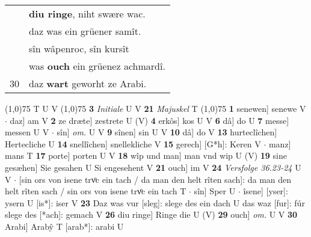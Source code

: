 \documentclass[8pt,a4paper,notitlepage]{article}
\begin{document}
\begin{table}[ht]
\begin{minipage}[t]{0.5\linewidth}
\begin{tabular}{rl}
 & \textbf{diu ringe}, niht swære wac.\\ 
 & daz was ein grüener samît.\\ 
 & sîn wâpenroc, sîn kursît\\ 
 & was \textbf{ouch} ein grüenez achmardî.\\ 
30 & daz \textbf{wart} geworht ze Arabi.\\ 
\end{tabular}
\scriptsize
\line(1,0){75} \newline
T U V \newline
\line(1,0){75} \newline
\textbf{3} \textit{Initiale} U V  \textbf{21} \textit{Majuskel} T  \newline
\line(1,0){75} \newline
\textbf{1} senewen] senewe V  $\cdot$ daz] am V \textbf{2} ze dræte] zestrete U (V) \textbf{4} erkôs] kos U V \textbf{6} dâ] do U \textbf{7} messe] messen U V  $\cdot$ sîn] \textit{om.} U V \textbf{9} sînen] sin U V \textbf{10} dâ] do V \textbf{13} hurteclîchen] Hertecliche U \textbf{14} snellîchen] snellekliche V \textbf{15} gerech] [G*h]: Keren V  $\cdot$ manz] mans T \textbf{17} porte] porten U V \textbf{18} wîp und man] man vnd wip U (V) \textbf{19} sine gesæhen] Sie gesahen U Si engesehent V \textbf{21} ouch] im V \textbf{24} \textit{Versfolge 36.23-24} U V   $\cdot$ [sin ors von isene trvͦc ein tach / da man den helt rîten sach]: da man den helt rîten sach / sin ors von isene trvͦc ein tach T  $\cdot$ sîn] Sper U  $\cdot$ îsene] [yser]: ysern U [is*]: iser V \textbf{23} Daz was vur [sleg]: slege des ein dach U das waz [fur]: fúr slege des [*ach]: gemach V \textbf{26} diu ringe] Ringe die U (V) \textbf{29} ouch] \textit{om.} U V \textbf{30} Arabi] Arabŷ T [arab*]: arabi U \newline
\end{minipage}
\end{table}
\end{document}
